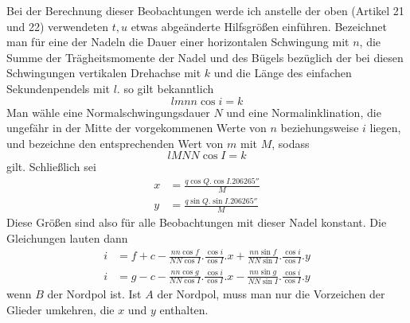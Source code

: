 Bei der Berechnung dieser Beobachtungen werde ich anstelle der oben (Artikel 21 und 22) verwendeten $t,u$ etwas abgeänderte Hilfsgrößen einführen. Bezeichnet man für eine der Nadeln die Dauer einer horizontalen Schwingung mit $n$, die Summe der Trägheitsmomente der Nadel und des Bügels bezüglich der bei diesen Schwingungen vertikalen Drehachse mit $k$ und die Länge des einfachen Sekundenpendels mit $l$. so gilt bekanntlich
\[
lmnn\cos i=k
\]
Man wähle eine Normalschwingungsdauer $N$ und eine Normalinklination, die ungefähr in der Mitte der vorgekommenen Werte von $n$ beziehungsweise $i$ liegen, und bezeichne den entsprechenden Wert von $m$ mit $M$, sodass
\[
lMNN\cos I=k
\]
gilt. Schließlich sei
\[
\begin{aligned}
x&=\frac{q\cos Q.\cos I.206265''}{M}\\
y&=\frac{q\sin Q.\sin I.206265''}{M}
\end{aligned}
\]
Diese Größen sind also für alle Beobachtungen mit dieser Nadel konstant. Die Gleichungen lauten dann
\[
\begin{aligned}
i&=f+c-\frac{nn\cos f}{NN\cos I}.\frac{\cos i}{\cos I}.x+\frac{nn\sin f}{NN\sin I}.\frac{\cos i}{\cos I}.y\\
i&=g-c-\frac{nn\cos g}{NN\cos I}.\frac{\cos i}{\cos I}.x-\frac{nn\sin g}{NN\sin I}.\frac{\cos i}{\cos I}.y
\end{aligned}
\]
wenn $B$ der Nordpol ist. Ist $A$ der Nordpol, muss man nur die Vorzeichen der Glieder umkehren, die $x$ und $y$ enthalten.

